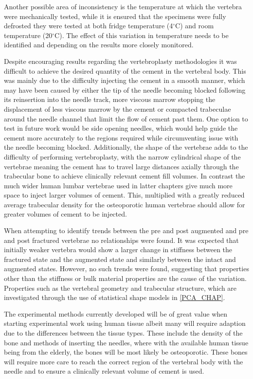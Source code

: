 Another possible area of inconsistency is the temperature at which the vertebra
were mechanically tested, while it is ensured that the specimens were fully
defrosted they were tested at both fridge temperature (4$^\circ$C) and room
temperature (20$^\circ$C).  The effect of this variation in temperature needs
to be identified and depending on the results more closely monitored.

Despite encouraging results regarding the vertebroplasty methodologies it was
difficult to achieve the desired quantity of the cement in the vertebral body.
This was mainly due to the difficulty injecting the cement in a smooth manner,
which may have been caused by either the tip of the needle becoming blocked
following its reinsertion into the needle track, more viscous marrow stopping
the displacement of less viscous marrow by the cement or compacted trabeculae
around the needle channel that limit the flow of cement past them.  One option
to test in future work would be side opening needles, which would help guide
the cement more accurately to the regions required while circumventing issue
with the needle becoming blocked.  Additionally, the shape of the vertebrae
adds to the difficulty of performing vertebroplasty, with the narrow
cylindrical shape of the vertebrae meaning the cement has to travel large
distances axially through the trabecular bone to achieve clinically relevant
cement fill volumes.  In contrast the much wider human lumbar vertebrae used in
latter chapters give much more space to inject larger volumes of cement.  This,
multiplied with a greatly reduced average trabecular density for the
osteoporotic human vertebrae should allow for greater volumes of cement to be
injected. 

When attempting to identify trends between the pre and post augmented and pre
and post fractured vertebrae no relationships were found.  It was expected that
initially weaker vertebra would show a larger change in stiffness between the
fractured state and the augmented state and similarly between the intact and
augmented states.  However, no such trends were found, suggesting that
properties other than the stiffness or bulk material properties are the cause
of the variation.  Properties such as the vertebral geometry and trabecular
structure, which are investigated through the use of statistical shape models
in \cref{PCA_CHAP}.

The experimental methods currently developed will be of great value when
starting experimental work using human tissue albeit many will require adaption
due to the differences between the tissue types.  These include the density of
the bone and methods of inserting the needles, where with the available human
tissue being from the elderly, the bones will be most likely be osteoporotic.
These bones will require more care to reach the correct region of the vertebral
body with the needle and to ensure a clinically relevant volume of cement is
used.



